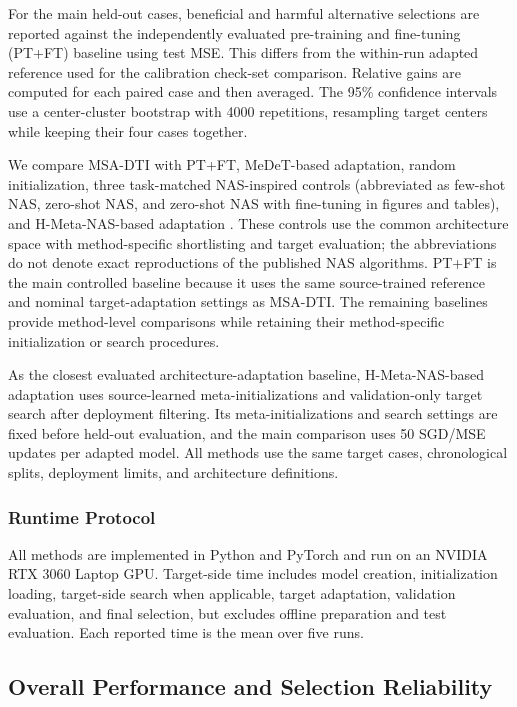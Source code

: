 \documentclass[a4paper,fleqn]{cas-sc}
\begin{document}
For the main held-out cases, beneficial and harmful alternative selections
are reported against the independently evaluated pre-training and fine-tuning
(PT+FT) baseline using test MSE. This differs from the within-run adapted
reference used for the calibration check-set comparison. Relative gains are
computed for each paired case and then averaged. The 95\% confidence intervals
use a center-cluster bootstrap with 4000 repetitions, resampling target centers
while keeping their four cases together.

We compare MSA-DTI with PT+FT, MeDeT-based adaptation, random
initialization, three task-matched NAS-inspired controls (abbreviated as
few-shot NAS, zero-shot NAS, and zero-shot NAS with fine-tuning in figures
and tables), and H-Meta-NAS-based adaptation \cite{ref14,ref15,ref30}.
These controls use the common architecture space with method-specific
shortlisting and target evaluation; the abbreviations do not denote exact
reproductions of the published NAS algorithms. PT+FT is the main
controlled baseline because it uses the
same source-trained reference and nominal target-adaptation settings as
MSA-DTI. The remaining baselines provide method-level comparisons while retaining their
method-specific initialization or search procedures.

As the closest evaluated architecture-adaptation baseline, H-Meta-NAS-based
adaptation uses source-learned meta-initializations and validation-only target
search after deployment filtering. Its meta-initializations and search settings are fixed before held-out
evaluation, and the main comparison uses 50 SGD/MSE updates per adapted
model. All methods use the same target
cases, chronological splits, deployment limits, and architecture definitions.

\subsubsection{Runtime Protocol}

All methods are implemented in Python and PyTorch and run on an NVIDIA RTX
3060 Laptop GPU. Target-side time includes model creation, initialization
loading, target-side search when applicable, target adaptation, validation
evaluation, and final selection, but excludes offline preparation and test
evaluation. Each reported time is the mean over five runs.

\subsection{Overall Performance and Selection Reliability}
\label{subsec:overall}
\end{document}
